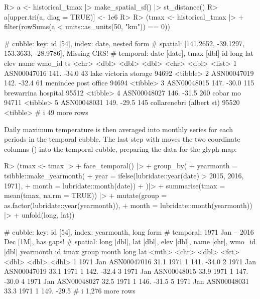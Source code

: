 \documentclass[
  shortnames]{jss}
\begin{document}
\begin{CodeChunk}
\begin{CodeInput}
R> a <- historical_tmax |> make_spatial_sf() |> st_distance()
R> a[upper.tri(a, diag = TRUE)] <- 1e6
R> 
R> (tmax <- historical_tmax |> 
+   filter(rowSums(a < units::as_units(50, "km")) == 0))
\end{CodeInput}
\begin{CodeOutput}
# cubble:   key: id [54], index: date, nested form
# spatial:  [141.2652, -39.1297, 153.3633, -28.9786], Missing CRS!
# temporal: date [date], tmax [dbl]
  id           long   lat  elev name                     wmo_id ts      
  <chr>       <dbl> <dbl> <dbl> <chr>                     <dbl> <list>  
1 ASN00047016  141. -34.0    43 lake victoria storage     94692 <tibble>
2 ASN00047019  142. -32.4    61 menindee post office      94694 <tibble>
3 ASN00048015  147. -30.0   115 brewarrina hospital       95512 <tibble>
4 ASN00048027  146. -31.5   260 cobar mo                  94711 <tibble>
5 ASN00048031  149. -29.5   145 collarenebri (albert st)  95520 <tibble>
# i 49 more rows
\end{CodeOutput}
\end{CodeChunk}

Daily maximum temperature is then averaged into monthly series for each periods in the temporal cubble. The last step with  moves the two coordinate columns () into the temporal cubble, preparing the data for the glyph map:

\begin{CodeChunk}
\begin{CodeInput}
R> (tmax <- tmax |>
+   face_temporal() |> 
+   group_by(
+     yearmonth = tsibble::make_yearmonth(
+       year = ifelse(lubridate::year(date) > 2015, 2016, 1971),
+       month = lubridate::month(date))
+   )|>
+   summarise(tmax = mean(tmax, na.rm = TRUE)) |> 
+   mutate(group = as.factor(lubridate::year(yearmonth)),
+          month = lubridate::month(yearmonth)) |> 
+   unfold(long, lat))
\end{CodeInput}
\begin{CodeOutput}
# cubble:   key: id [54], index: yearmonth, long form
# temporal: 1971 Jan -- 2016 Dec [1M], has gaps!
# spatial:  long [dbl], lat [dbl], elev [dbl], name [chr], wmo_id [dbl]
  yearmonth id           tmax group month  long   lat
      <mth> <chr>       <dbl> <fct> <dbl> <dbl> <dbl>
1  1971 Jan ASN00047016  31.1 1971      1  141. -34.0
2  1971 Jan ASN00047019  33.1 1971      1  142. -32.4
3  1971 Jan ASN00048015  33.9 1971      1  147. -30.0
4  1971 Jan ASN00048027  32.5 1971      1  146. -31.5
5  1971 Jan ASN00048031  33.3 1971      1  149. -29.5
# i 1,276 more rows
\end{CodeOutput}
\end{CodeChunk}
\end{document}
